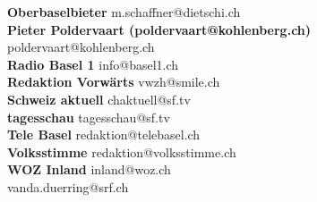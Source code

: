 \documentclass{scrartcl}
\begin{document}
\textbf{Oberbaselbieter } m.schaffner@dietschi.ch\\
\textbf{Pieter Poldervaart (poldervaart@kohlenberg.ch)\n	 } poldervaart@kohlenberg.ch\\
\textbf{Radio Basel 1 } info@basel1.ch\\
\textbf{Redaktion Vorwärts } vwzh@smile.ch\\
\textbf{Schweiz aktuell } chaktuell@sf.tv\\
\textbf{tagesschau } tagesschau@sf.tv\\
\textbf{Tele Basel } redaktion@telebasel.ch\\
\textbf{Volksstimme } redaktion@volksstimme.ch\\
\textbf{WOZ Inland } inland@woz.ch\\
\textbf{} vanda.duerring@srf.ch\\
\end{document}
